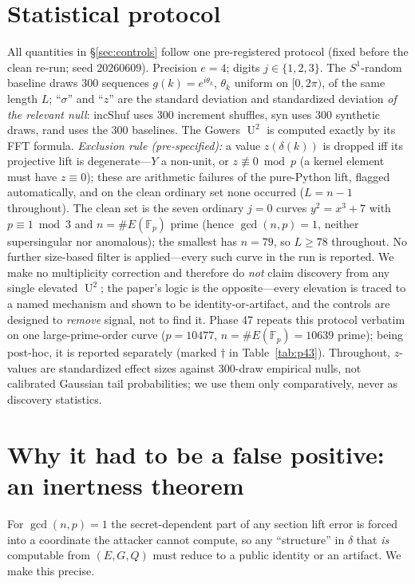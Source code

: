 \documentclass[11pt]{article}
\theoremstyle{definition}
\newcommand{\Fp}{\mathbb{F}_p}
\DeclareMathOperator{\Uk}{U}
\begin{document}
\section{Statistical protocol}\label{sec:stats}

All quantities in \S\ref{sec:controls} follow one pre-registered protocol
(fixed before the clean re-run; seed $20260609$). Precision $e=4$; digits
$j\in\{1,2,3\}$. The $S^1$-random baseline draws $300$ sequences
$g(k)=e^{i\theta_k}$, $\theta_k$ uniform on $[0,2\pi)$, of the same length
$L$; ``$\sigma$'' and ``$z$'' are the standard deviation and standardized
deviation \emph{of the relevant null}: incShuf uses $300$ increment
shuffles, syn uses $300$ synthetic draws, rand uses the $300$ baselines.
The Gowers $\Uk^2$ is computed exactly by its FFT formula. \emph{Exclusion
rule (pre-specified):} a value $z(\delta(k))$ is dropped iff its
projective lift is degenerate---$Y$ a non-unit, or $z\not\equiv 0\bmod p$
(a kernel element must have $z\equiv 0$); these are arithmetic failures of
the pure-Python lift, flagged automatically, and on the clean ordinary set
none occurred ($L=n-1$ throughout). The clean set is the seven ordinary
$j{=}0$ curves $y^2=x^3+7$ with $p\equiv 1\bmod 3$ and $n=\#E(\Fp)$ prime
(hence $\gcd(n,p)=1$, neither supersingular nor anomalous); the smallest
has $n=79$, so $L\ge 78$ throughout. No further size-based filter is
applied---every such curve in the run is reported.
We make no multiplicity correction and therefore do \emph{not} claim
discovery from any single elevated $\Uk^2$; the paper's logic is the
opposite---every elevation is traced to a named mechanism and shown to be
identity-or-artifact, and the controls are designed to \emph{remove}
signal, not to find it. Phase 47 repeats this protocol verbatim on one
large-prime-order curve ($p=10477$, $n=\#E(\Fp)=10639$ prime); being
post-hoc, it is reported separately (marked $\dagger$ in
Table~\ref{tab:p43}). Throughout, $z$-values are standardized effect
sizes against $300$-draw empirical nulls, not calibrated Gaussian tail
probabilities; we use them only comparatively, never as discovery
statistics.

\section{Why it had to be a false positive: an inertness theorem}
\label{sec:theorem}

For $\gcd(n,p)=1$ the secret-dependent part of any section lift error is
forced into a coordinate the attacker cannot compute, so any
``structure'' in $\delta$ that \emph{is} computable from $(E,G,Q)$ must
reduce to a public identity or an artifact. We make this precise.
\end{document}
